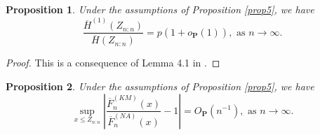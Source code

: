 \documentclass[reqno,openbib,runningheads,a4paper,12pt]{amsart}%
\newtheorem{proposition}{Proposition}[section]
\begin{document}
\begin{proposition}
\textbf{\label{prop6}}Under the assumptions of Proposition \ref{prop5}, we
have
\[
\frac{\overline{H}^{\left(  1\right)  }\left(  Z_{n:n}\right)  }{\overline
{H}\left(  Z_{n:n}\right)  }=p\left(  1+o_{\mathbf{P}}\left(  1\right)
\right)  ,\text{ as }n\rightarrow\infty.
\]

\end{proposition}

\begin{proof}
This is a consequence of Lemma 4.1 in \cite{BMN-2015}.
\end{proof}

\begin{proposition}
\textbf{\label{prop7}}Under the assumptions of Proposition \ref{prop5}, we
have%
\[
\sup_{x\leq Z_{n:n}}\left\vert \frac{\overline{F}_{n}^{\left(  KM\right)
}\left(  x\right)  }{\overline{F}_{n}^{\left(  NA\right)  }\left(  x\right)
}-1\right\vert =O_{\mathbf{P}}\left(  n^{-1}\right)  ,\text{ as }%
n\rightarrow\infty.
\]

\end{proposition}
\end{document}
